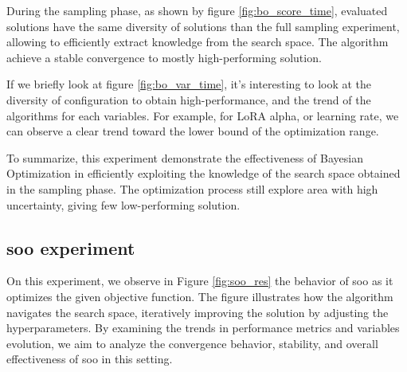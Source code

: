 During the sampling phase, as shown by figure \ref{fig:bo_score_time}, evaluated solutions have the same diversity of solutions than the full sampling experiment, allowing to efficiently extract knowledge from the search space. The algorithm achieve a stable convergence to mostly high-performing solution.

If we briefly look at figure \ref{fig:bo_var_time}, it's interesting to look at the diversity of configuration to obtain high-performance, and the trend of the algorithms for each variables. For example, for LoRA alpha, or learning rate, we can observe a clear trend toward the lower bound of the optimization range. 

To summarize, this experiment demonstrate the effectiveness of Bayesian Optimization in efficiently exploiting the knowledge of the search space obtained in the sampling phase. The optimization process still explore area with high uncertainty, giving few low-performing solution.


\subsection{\acrshort{soo} experiment}
\label{sec:soo_exp}
On this experiment, we observe in Figure \ref{fig:soo_res} the behavior of \acrshort{soo} as it optimizes the given objective function. The figure illustrates how the algorithm navigates the search space, iteratively improving the solution by adjusting the hyperparameters. By examining the trends in performance metrics and variables evolution, we aim to analyze the convergence behavior, stability, and overall effectiveness of \acrshort{soo} in this setting.

